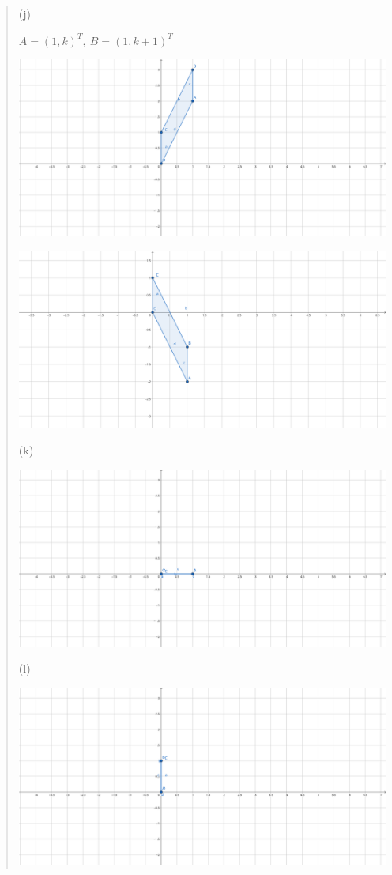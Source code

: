 \documentclass{article}
\begin{document}
\begin{quote}
    (j)

    $A = (1, k)^T, \ B = (1, k + 1)^T$
    
        \includegraphics[width=0.75\linewidth]{geogebra-export(12).png}

        \includegraphics[width=0.75\linewidth]{geogebra-export(15).png}

    (k) 
    
            \includegraphics[width=0.75\linewidth]{geogebra-export(13).png}

    (l)

        \includegraphics[width=0.75\linewidth]{geogebra-export(14).png}
\end{quote}
\end{document}

